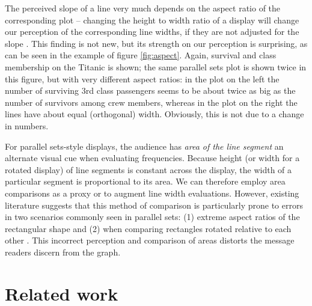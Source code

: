 The perceived slope of a line very much depends on the aspect ratio of the corresponding plot -- changing the height to width ratio of a display  will change our perception of the corresponding line widths, if they are not adjusted for the slope \cite{cleveland:1984}. This finding is not new, but its strength on our perception is surprising, as can be seen in the example of  figure \ref{fig:aspect}.  Again, survival and class membership on the Titanic is shown; the same parallel sets plot is shown twice in this figure, but with very different aspect ratios: in the  plot on the left the number of surviving 3rd class passengers seems to be about twice as big as the number of survivors among crew members, whereas in the plot on the right the lines have about equal (orthogonal) width. Obviously, this is not due to a change in numbers.

For parallel sets-style displays, the audience has {\it area of the line segment} an alternate visual cue when evaluating frequencies. Because height (or width for a rotated display) of  line segments is constant across the display, the width of a particular  segment is proportional to its area. We can therefore employ area comparisons as a proxy or to augment line width evaluations. 
However, existing literature suggests that this method of comparison is particularly  prone to errors in two scenarios commonly seen in parallel sets: (1) extreme aspect ratios of the rectangular shape \cite{heer:2010} %
and (2) when comparing rectangles rotated relative to each other \cite{kong:2010}. 
This incorrect perception and comparison of areas distorts the message readers discern from the graph. %


\section{Related work}


